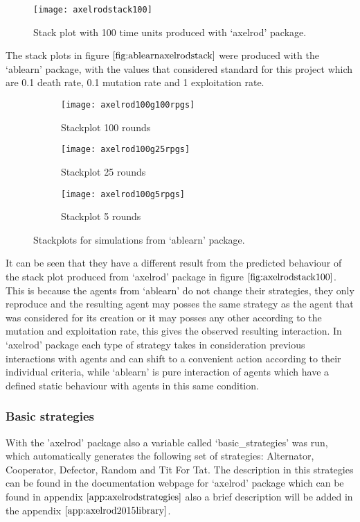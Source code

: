 \begin{figure}[H]
\begin{center}
	\texttt{[image: axelrodstack100]}

\caption{Stack plot with 100 time units produced with `axelrod' package.}
\label{fig:axelrodstack100}
\end{center}
\end{figure}
The stack plots in figure $\ref{fig:ablearnaxelrodstack}$ were produced with the `ablearn' package, with the values that considered standard for this project which are 0.1 death rate, 0.1 mutation rate and 1 exploitation rate.
\begin{figure}[H]       
    \centering
    \begin{subfigure}[b]{0.4\textwidth}
	\centering
	{\texttt{[image: axelrod100g100rpgs]}}   
    	\caption{Stackplot 100 rounds}
	\label{fig:axl100rpgs}
    \end{subfigure}
    \hfill
    \begin{subfigure}[b]{0.4\textwidth}
	\centering
	{\texttt{[image: axelrod100g25rpgs]}}   
    	\caption{Stackplot 25 rounds}
	\label{fig:axl25rpgs}
    \end{subfigure}
    \hfill
    \begin{subfigure}[b]{0.4\textwidth}
	\centering
	{\texttt{[image: axelrod100g5rpgs]}}   
    	\caption{Stackplot 5 rounds}
	\label{fig:axl5rpgs}
    \end{subfigure}
    \caption{Stackplots for simulations from `ablearn' package.}
    \label{fig:ablearnaxelrodstack}
\end{figure}
It can be seen that they have a different result from the predicted behaviour of the stack plot produced from `axelrod' package in figure $\ref{fig:axelrodstack100}$. This is because the agents from `ablearn' do not change their strategies, they only reproduce and the resulting agent may posses the same strategy as the agent that was considered for its creation or it may posses any other according to the mutation and exploitation rate, this gives the observed resulting interaction. In `axelrod' package each type of strategy takes in consideration previous interactions with agents and can shift to a convenient action according to their individual criteria, while `ablearn' is pure interaction of agents which have a defined static behaviour with agents in this same condition.


\subsubsection{Basic strategies}
With the 'axelrod' package also a variable called `basic\_strategies' was run, which automatically generates the following set of strategies: Alternator, Cooperator, Defector, Random and Tit For Tat. The description in this strategies can be found in the documentation webpage for `axelrod' package which can be found in appendix $\ref{app:axelrodstrategies}$ also a brief description will be added in the appendix $\ref{app:axelrod2015library}$.

